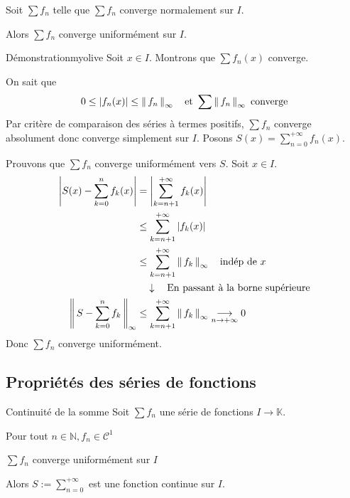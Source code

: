     \begin{prop}{}{}
        Soit $\sum f_n$ telle que $\sum f_n$ converge normalement sur $I$.

        Alors $\sum f_n$ converge uniformément sur $I$.
    \end{prop}

    \begin{demo}{Démonstration}{myolive}
        Soit $x \in I$. Montrons que $\sum f_n(x)$ converge. 

        On sait que 
        \[ 0 \leq \left\lvert f_n(x)\right\rvert \leq \left\lVert\,f_n\,\right\rVert_{\infty} \quad \text{et } \sum \left\lVert\,f_n\,\right\rVert_{\infty} \text{ converge} \] 
        Par critère de comparaison des séries à termes positifs, $\sum f_n$ converge absolument donc converge simplement sur $I$. Posons $S(x) = \sum_{n=0}^{+\infty} f_n(x)$. 

        Prouvons que $\sum f_n$ converge uniformément vers $S$. Soit $x \in I$.
        \begin{align*}
            \left\lvert S(x) - \sum_{k=0}^{n} f_k(x)\right\rvert 
            &= \left\lvert \sum_{k=n+1}^{+\infty} f_k(x)\right\rvert \\
            &\leq \sum_{k=n+1}^{+\infty} \left\lvert f_k(x)\right\rvert \\
            &\leq \sum_{k=n+1}^{+\infty} \left\lVert\,f_k\,\right\rVert_{\infty} \quad \text{indép de } x \\
            & \quad \downarrow \quad \text{En passant à la borne supérieure} \\
            \left\lVert\,S - \sum_{k=0}^{n} f_k\,\right\rVert_{\infty} 
            &\leq \sum_{k=n+1}^{+\infty} \left\lVert\,f_k\,\right\rVert_{\infty} \underset{n \rightarrow +\infty}{\longrightarrow} 0
        \end{align*}
        Donc $\sum f_n$ converge uniformément.
    \end{demo}

\subsection{Propriétés des séries de fonctions}

    \begin{prop}{Continuité de la somme}{}
        Soit $\sum f_n$ une série de fonctions $I \rightarrow \mathbb{K}$. 
        \begin{suppose}
            \item Pour tout $n \in \mathbb{N}, f_n \in \mathcal{C}^1$
            \item $\sum f_n$ converge uniformément sur $I$
        \end{suppose}
        Alors $S := \sum_{n=0}^{+\infty}$ est une fonction continue sur $I$.
    \end{prop}

